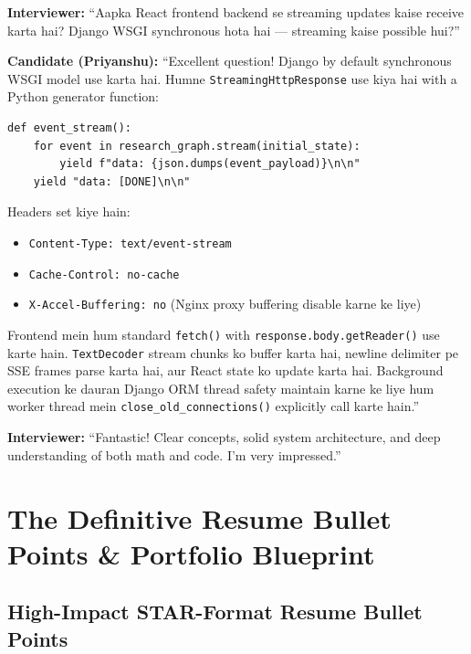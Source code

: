 \documentclass[11pt,a4paper,twoside]{report}
\begin{document}
\textbf{Interviewer:} ``Aapka React frontend backend se streaming updates kaise receive karta hai? Django WSGI synchronous hota hai --- streaming kaise possible hui?''

\textbf{Candidate (Priyanshu):} ``Excellent question! Django by default synchronous WSGI model use karta hai. Humne \texttt{StreamingHttpResponse} use kiya hai with a Python generator function:

\begin{lstlisting}[style=pythonstyle]
def event_stream():
    for event in research_graph.stream(initial_state):
        yield f"data: {json.dumps(event_payload)}\n\n"
    yield "data: [DONE]\n\n"
\end{lstlisting}

Headers set kiye hain:
\begin{itemize}
    \item \texttt{Content-Type: text/event-stream}
    \item \texttt{Cache-Control: no-cache}
    \item \texttt{X-Accel-Buffering: no} (Nginx proxy buffering disable karne ke liye)
\end{itemize}

Frontend mein hum standard \texttt{fetch()} with \texttt{response.body.getReader()} use karte hain. \texttt{TextDecoder} stream chunks ko buffer karta hai, newline delimiter pe SSE frames parse karta hai, aur React state ko update karta hai.
Background execution ke dauran Django ORM thread safety maintain karne ke liye hum worker thread mein \texttt{close\_old\_connections()} explicitly call karte hain.''

\textbf{Interviewer:} ``Fantastic! Clear concepts, solid system architecture, and deep understanding of both math and code. I'm very impressed.''



\chapter{The Definitive Resume Bullet Points \& Portfolio Blueprint}

\section{High-Impact STAR-Format Resume Bullet Points}
\end{document}

